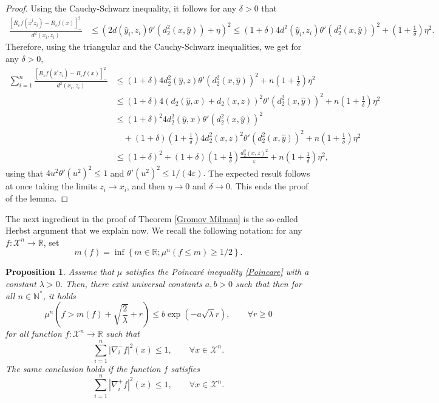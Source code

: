 \documentclass[11pt]{amsart}
\newtheorem{prop}[equation]{Proposition}
\numberwithin{equation}{section}
\begin{document}
\begin{proof}
Using the Cauchy-Schwarz inequality, it follows for any $\delta>0$ that
\begin{align*}
\frac {[R_\varepsilon f(\bar x^i z_i)-R_\varepsilon f(x)]_-^2}{d^2(x_i,z_i)}
& \leq 
\left( 2 d(\hat y_i,z_i)
\theta'(d_2^2(x,\hat y))
+\eta \right) ^2  
 \leq
(1+\delta) 4 d^2(\hat y_i,z_i) \theta'(d_2^2(x,\hat y))^2 + \left(1+\frac{1}{\delta}\right)\eta^2 .
\end{align*}
Therefore, using the triangular and the Cauchy-Schwarz inequalities, we get for any $\delta>0$,
\begin{align*}
\sum_{i=1}^n \frac {[R_\varepsilon f(\bar x^i z_i)-R_\varepsilon f(x)]_-^2}{d^2(x_i,z_i)}
& \leq 
(1+\delta) 4 d_2^2(\hat y,z) \theta'(d_2^2(x,\hat y))^2 + n\left(1+\frac{1}{\delta}\right)\eta^2 \\
& \leq 
(1+\delta) 4 (d_2(\hat y,x) + d_2(x,z))^2 \theta'(d_2^2(x,\hat y))^2 + n\left(1+\frac{1}{\delta}\right)\eta^2 \\
& \leq 
(1+\delta)^2 4 d_2^2(\hat y,x)  \theta'(d_2^2(x,\hat y))^2 \\
& \quad
+ (1+\delta)\left(1+\frac{1}{\delta}\right) 4 d_2^2(x,z)^2 \theta'(d_2^2(x,\hat y))^2 
+ n\left(1+\frac{1}{\delta}\right)\eta^2 \\
& \leq (1+\delta)^2 + (1+\delta)\left(1+\frac{1}{\delta}\right) \frac {d_2^2(x,z)^2}{\varepsilon}
+ n\left(1+\frac{1}{\delta}\right)\eta^2,
\end{align*}
using that $4u^2\theta'(u^2)^2 \leq 1$ and $\theta'(u^2)^2\leq 1/(4\varepsilon).$
The expected result follows at once taking the limits
$z_i \to x_i$, and then $\eta \to 0$ and $\delta \to 0$.
This ends the proof of the lemma.
\end{proof}

The next ingredient in the proof of Theorem \ref{Gromov Milman} is the so-called Herbst argument
that we explain now. We recall the following notation: for any $f \colon {\mathcal{X}}^n \to {\mathbb{R}}$, set
\[
m(f)=\inf\left\{ m\in {\mathbb{R}}; \mu^n(f\leq m)\geq 1/2 \right\}.
\]
\begin{prop}\label{Herbst}
Assume that $\mu$ satisfies the Poincar\'e inequality \eqref{Poincare} with a constant $\lambda>0$. Then, there exist universal constants $a,b>0$ such that  then for all $n\in {\mathbb{N}}^*$, it holds
\[
\mu^n\left(f>m\left(  f\right) + \sqrt{\frac { 2} {\lambda }} +r\right)\leq b\exp\left(-a\sqrt{\lambda}r\right),\qquad \forall r\geq0
\]
for all function $f:{\mathcal{X}}^n\to {\mathbb{R}}$ such that 
\begin{equation}\label{eq:gradient-}
\sum_{i=1}^n |\nabla^-_if|^2(x)\leq 1,\qquad \forall x\in {\mathcal{X}}^n.
\end{equation}
The same conclusion holds if the function $f$ satisfies
\begin{equation}\label{eq:gradient+}
\sum_{i=1}^n |\nabla^+_if|^2(x)\leq 1,\qquad \forall x\in {\mathcal{X}}^n.
\end{equation}
\end{prop}
\end{document}
